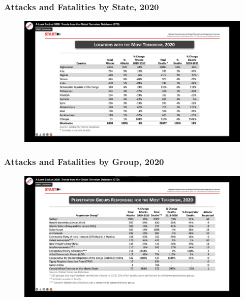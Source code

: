 \documentclass{beamer}
\begin{document}
\begin{frame} 
	\frametitle{\LARGE{Attacks and Fatalities by State, 2020}}
	\begin{figure}[ht!]
		\centering
		\includegraphics[width=\textwidth,height=\textheight,keepaspectratio]{terrorismlocations2020.png}
	\end{figure}
\end{frame}

\begin{frame} 
	\frametitle{\LARGE{Attacks and Fatalities by Group, 2020}}
	\begin{figure}[ht!]
		\centering
		\includegraphics[width=\textwidth,height=\textheight,keepaspectratio]{terrorismperp2020.png}
	\end{figure}
\end{frame}
\end{document}
